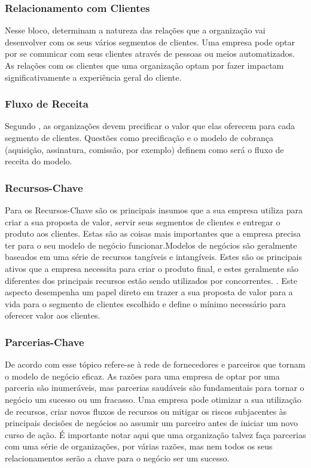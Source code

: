 \subsubsection{Relacionamento com Clientes}
\label{cha:relacionamentos_com_clientes}
Nesse bloco,  determinam a natureza das relações que a organização vai desenvolver com os seus vários segmentos de clientes. Uma empresa pode optar por se comunicar com seus clientes através de pessoas ou meios automatizados. As relações com os clientes que uma organização optam por fazer impactam significativamente a experiência geral do cliente.

\subsubsection{Fluxo de Receita}
\label{cha:fluxo_de_receita}
Segundo , as organizações devem precificar o valor que elas oferecem para cada segmento de clientes. Questões como precificação e o modelo de cobrança (aquisição, assinatura, comissão, por exemplo) definem como será o fluxo de receita do modelo.

\subsubsection{Recursos-Chave}
\label{cha:recursos_chave}
Para  os Recursos-Chave são os principais insumos que a sua empresa utiliza para criar a sua proposta de valor, servir seus segmentos de clientes e entregar o produto aos clientes. Estas são as coisas mais importantes que a empresa precisa ter para o seu modelo de negócio funcionar.Modelos de negócios são geralmente baseados em uma série de recursos tangíveis e intangíveis. Estes são os principais ativos que a empresa necessita para criar o produto final, e estes geralmente são diferentes dos principais recursos estão sendo utilizados por concorrentes. . Este aspecto desempenha um papel direto em trazer a sua proposta de valor para a vida para o segmento de clientes escolhido e define o mínimo necessário para oferecer valor aos clientes.

\subsubsection{Parcerias-Chave}
\label{cha:parcerias_chave}
De acordo com  esse tópico refere-se à rede de fornecedores e parceiros que
tornam o modelo de negócio eficaz. As razões para uma empresa de optar por uma parceria são inumeráveis, mas parcerias saudáveis são fundamentais para tornar o negócio um sucesso ou um
fracasso. Uma empresa pode otimizar a sua utilização de recursos, criar novos fluxos de recursos ou
mitigar os riscos subjacentes às principais decisões de negócios ao assumir um parceiro antes de
iniciar um novo curso de ação. É importante notar aqui que uma organização talvez faça parcerias com
uma série de organizações, por várias razões, mas nem todos os seus relacionamentos serão a chave
para o negócio ser um sucesso.

